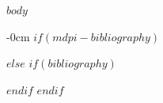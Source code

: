 \documentclass[remotesensing,article,submit,pdftex,oneauthor]{Definitions/mdpi}
\begin{document}
$body$

\begin{adjustwidth}{-\extralength}{0cm}
$if(mdpi-bibliography)$

$else$
$if(bibliography)$

$endif$
$endif$
\end{adjustwidth}
\end{document}
